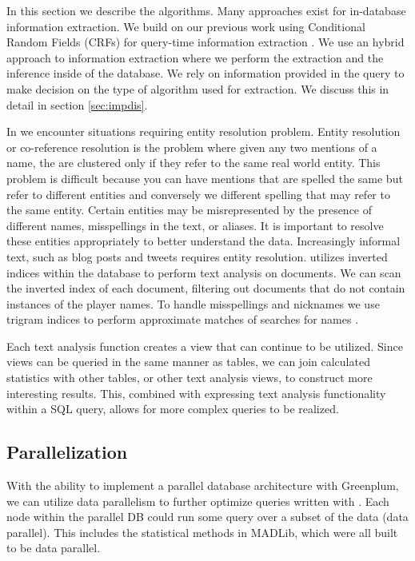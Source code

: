 In this section we describe the {\system} algorithms.
Many approaches exist for in-database information extraction. 
We build on our previous work using Conditional Random Fields (CRFs) for 
query-time information extraction \cite{wang2011hybrid}.
We use an hybrid approach to information extraction where we perform the 
extraction and the inference inside of the database. We rely on information
provided in the query to make decision on the type of algorithm used 
for extraction. 
We discuss this in detail in section \ref{sec:impdis}.

In {\system} we encounter situations requiring entity resolution problem.
Entity resolution or co-reference resolution is the problem where given any two
mentions of a name, the are clustered only if they refer to the same real 
world entity. This problem is difficult because you can have mentions that are
spelled the same but refer to different entities and conversely we different
spelling that may refer to the same entity.
Certain entities may be misrepresented by the presence of different names, 
misspellings in the text, or aliases. It is important to
resolve these entities appropriately to better understand the data. Increasingly
informal text, such as blog posts and tweets requires entity resolution. 
{\system} utilizes inverted indices within the database to perform text
analysis on documents. We can scan the inverted index of each 
document, filtering out documents that do not contain instances of the player names.
To handle misspellings and nicknames we use trigram indices to perform 
approximate matches of searches for names \cite{Jain:2009:BQO:1519103.1519108}.

Each text analysis function creates a view that can continue to be utilized.
Since views can be queried in the same manner as tables, we can join calculated
statistics with other tables, or other text analysis views, to construct more
interesting results. This, combined with expressing text analysis functionality
within a SQL query, allows for more complex queries to be realized. \\



\subsection{Parallelization}
With the ability to implement a parallel database architecture with %
Greenplum, we can utilize data parallelism to further optimize queries written
with {\system}. Each node within the parallel DB could run some query
over a subset of the data (data parallel). This includes the statistical methods
in MADLib, which were all built to be data parallel.

